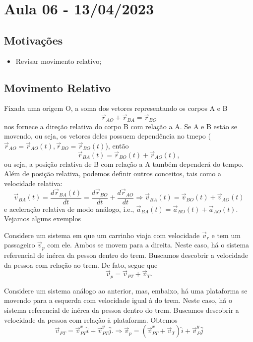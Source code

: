 \documentclass[physics_notes.tex]{subfiles}
\begin{document}
\section{Aula 06 - 13/04/2023}
\subsection{Motivações}
\begin{itemize}
	\item Revisar movimento relativo;
\end{itemize}

\subsection{Movimento Relativo}
Fixada uma origem O, a soma dos vetores representando os corpos A e B
$$
	\vec{r}_{AO} + \vec{r}_{BA} = \vec{r}_{BO}
$$
nos fornece a direção relativa do corpo B com relação a A. Se A e B estão se movendo, ou seja, os vetores deles
possuem dependência no tmepo ($\vec{r}_{AO} = \vec{r}_{AO}(t), \vec{r}_{BO} = \vec{r}_{BO}(t)$), então
$$
	\vec{r}_{BA}(t) = \vec{r}_{BO}(t) + \vec{r}_{AO}(t),
$$
ou seja, a posição relativa de B com relação a A também dependerá do tempo. Além de posição relativa,
podemos definir outros conceitos, tais como a velocidade relativa:
$$
	\vec{v}_{BA}(t) = \frac{d \vec{r}_{BA}(t)}{dt} = \frac{d \vec{r}_{BO}}{dt} + \frac{d \vec{r}_{AO}}{dt} \Rightarrow \vec{v}_{BA}(t) = \vec{v}_{BO}(t)  + \vec{v}_{AO}(t)
$$
e aceleração relativa de modo análogo, i.e., $\vec{a}_{BA}(t) = \vec{a}_{BO}(t) + \vec{a}_{AO}(t).$ Vejamos alguns exemplos
\begin{example}
	Considere um sistema em que um carrinho viaja com velocidade $\vec{v}_{r}$ e tem um passageiro $\vec{v}_{p}$ com ele.
	Ambos se movem para a direita.
	Neste caso, há o sistema referencial de inérca da pessoa dentro do trem. Buscamos descobrir a velocidade da pessoa com relação ao trem.
	De fato, segue que
	$$
		\vec{v}_{p} = \vec{v}_{PT} + \vec{v}_{T}.
	$$
\end{example}
\begin{example}
	Considere um sistema análogo ao anterior, mas, embaixo, há uma plataforma se movendo para a esquerda com velocidade igual à do trem.
	Neste caso, há o sistema referencial de inérca da pessoa dentro do trem. Buscamos descobrir a velocidade da pessoa com relação
	à plataforma. Obtemos
	$$
		\vec{v}_{PT} = \vec{v}_{PT}^{x}\hat{i} + \vec{v}_{PT}^{y}\hat{j}. \Rightarrow \vec{v}_{p} = (\vec{v}_{PT}^{x} + \vec{v}_{T})\hat{i} + \vec{v}_{P}^{y}\hat{j}
	$$
\end{example}
\end{document}
